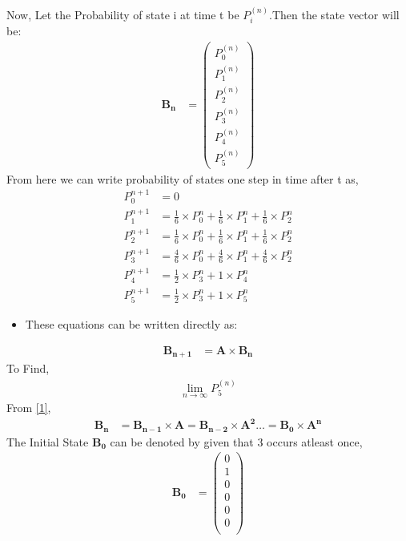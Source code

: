 \documentclass[journal,12pt,onecolumn]{IEEEtran}
\begin{document}
Now, Let the Probability of state i at time t be $P_{i}^{(n)}$.Then the state vector will be: 
\begin{align}
\label{eq:5}
\mathbf{B_{n}} &= 
\begin{pmatrix}
P_{0}^{(n)} \\[2pt]
P_{1}^{(n)} \\[2pt]
P_{2}^{(n)} \\[2pt]
P_{3}^{(n)} \\[2pt]
P_{4}^{(n)} \\[2pt]
P_{5}^{(n)}
\end{pmatrix}
\end{align}
From here we can write probability of states one step in time after t as,
\begin{align}
    P_{0}^{n+1} &= 0 \\
    P_{1}^{n+1} &= \frac{1}{6} \times P_{0}^{n} + \frac{1}{6} \times P_{1}^{n} + \frac{1}{6} \times P_{2}^{n} \\ 
    P_{2}^{n+1} &=  \frac{1}{6} \times P_{0}^{n} + \frac{1}{6} \times P_{1}^{n} + \frac{1}{6} \times P_{2}^{n}\\
    P_{3}^{n+1} &= \frac{4}{6} \times P_{0}^{n} + \frac{4}{6} \times P_{1}^{n} + \frac{4}{6} \times P_{2}^{n}  \\
    P_{4}^{n+1} &= \frac{1}{2} \times P_{3}^{n} + 1 \times P_{4}^{n}   \\
    P_{5}^{n+1} &= \frac{1}{2} \times P_{3}^{n} + 1 \times P_{5}^{n}  
\end{align}
\begin{itemize}
    \item These equations can be written directly as:
\end{itemize}
\begin{align}
   \label{1}
    \mathbf{B_{n+1}} &= \mathbf{A} \times \mathbf{B_{n}}
\end{align}
To Find,
\begin{align}
    \lim_{n \to \infty} P_{5}^{(n)}
\end{align}
From \eqref{1},
\begin{align}
    \mathbf{B_{n}} &= \mathbf{B_{n-1}} \times \mathbf{A} = \mathbf{B_{n-2}} \times \mathbf{A^2} \dots
    =\mathbf{B_{0}} \times \mathbf{A^n}
\end{align}
The Initial State $\mathbf{B_{0}}$ can be denoted by given that 3 occurs atleast once,
\begin{align}
\mathbf{B_{0}} &= 
\begin{pmatrix}
0 \\
1 \\
0\\
0\\
0\\
0\\
\end{pmatrix}
\end{align}
\end{document}
